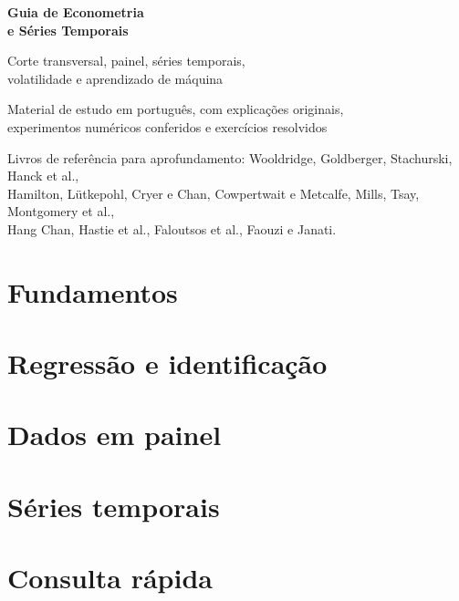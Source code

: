 

\frontmatter
\begin{titlepage}
\centering
\vspace*{3cm}
{\sffamily\bfseries\color{azul}\fontsize{28}{34}\selectfont Guia de Econometria\\e Séries Temporais\par}
\vspace{1cm}
{\sffamily\Large Corte transversal, painel, séries temporais,\\volatilidade e aprendizado de máquina\par}
\vspace{2cm}
{\large Material de estudo em português, com explicações originais,\\experimentos numéricos conferidos e exercícios resolvidos\par}
\vfill
{\small Livros de referência para aprofundamento: Wooldridge, Goldberger, Stachurski, Hanck et al.,\\Hamilton, Lütkepohl, Cryer e Chan, Cowpertwait e Metcalfe, Mills, Tsay, Montgomery et al.,\\Hang Chan, Hastie et al., Faloutsos et al., Faouzi e Janati.}
\end{titlepage}
\tableofcontents
\mainmatter

\part{Fundamentos}


\part{Regressão e identificação}



\part{Dados em painel}

\part{Séries temporais}







\part{Consulta rápida}


